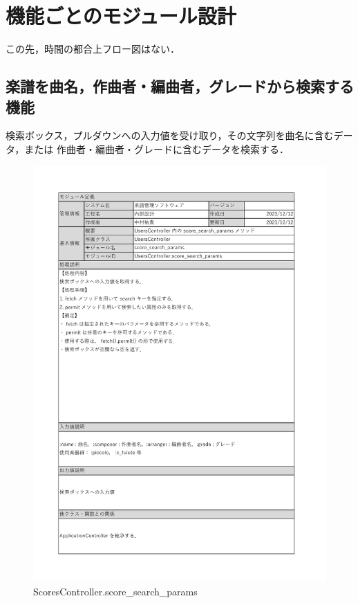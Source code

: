 \section{機能ごとのモジュール設計}
この先，時間の都合上フロー図はない．

\vspace{-0.5cm}
\subsection*{楽譜を曲名，作曲者・編曲者，グレードから検索する機能}
検索ボックス，プルダウンへの入力値を受け取り，その文字列を曲名に含むデータ，または
作曲者・編曲者・グレードに含むデータを検索する．
\begin{figure}[H]
    \centering
    \includegraphics[scale=0.5]{img/Method/score_search_params}
    \caption{ScoresController.score\_search\_params}
    \label{ScoresController.score-search-params}
\end{figure}
